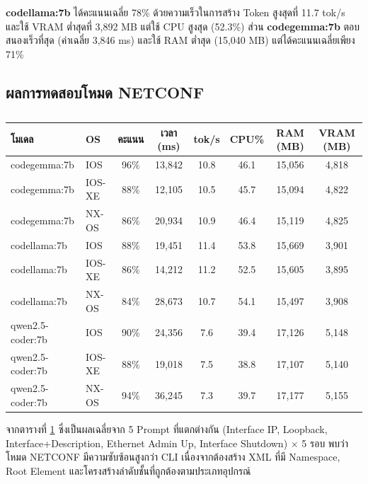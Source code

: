 \hspace*{1.3em}
\textbf{codellama:7b} ได้คะแนนเฉลี่ย 78\% ด้วยความเร็วในการสร้าง Token สูงสุดที่ 11.7 tok/s และใช้ VRAM ต่ำสุดที่ 3,892 MB แต่ใช้ CPU สูงสุด (52.3\%) ส่วน \textbf{codegemma:7b} ตอบสนองเร็วที่สุด (ค่าเฉลี่ย 3,846 ms) และใช้ RAM ต่ำสุด (15,040 MB) แต่ได้คะแนนเฉลี่ยเพียง 71\%

\subsection{ผลการทดสอบโหมด NETCONF}

\begin{table}[H]
    \caption{}
    \label{tab:benchmark-netconf}
    \fontSixTeen
    \centering
    \begin{tabularx}{\textwidth}{|l|l|c|c|c|c|c|c|}
        \hline
        \textbf{โมเดล} & \textbf{OS} & \textbf{คะแนน} & \textbf{เวลา (ms)} & \textbf{tok/s} & \textbf{CPU\%} & \textbf{RAM (MB)} & \textbf{VRAM (MB)} \\
        \hline
        codegemma:7b & IOS & 96\% & 13,842 & 10.8 & 46.1 & 15,056 & 4,818 \\
        \hline
        codegemma:7b & IOS-XE & 88\% & 12,105 & 10.5 & 45.7 & 15,094 & 4,822 \\
        \hline
        codegemma:7b & NX-OS & 86\% & 20,934 & 10.9 & 46.4 & 15,119 & 4,825 \\
        \hline
        codellama:7b & IOS & 88\% & 19,451 & 11.4 & 53.8 & 15,669 & 3,901 \\
        \hline
        codellama:7b & IOS-XE & 86\% & 14,212 & 11.2 & 52.5 & 15,605 & 3,895 \\
        \hline
        codellama:7b & NX-OS & 84\% & 28,673 & 10.7 & 54.1 & 15,497 & 3,908 \\
        \hline
        qwen2.5-coder:7b & IOS & 90\% & 24,356 & 7.6 & 39.4 & 17,126 & 5,148 \\
        \hline
        qwen2.5-coder:7b & IOS-XE & 88\% & 19,018 & 7.5 & 38.8 & 17,107 & 5,140 \\
        \hline
        qwen2.5-coder:7b & NX-OS & 94\% & 36,245 & 7.3 & 39.7 & 17,177 & 5,155 \\
        \hline
    \end{tabularx}
\end{table}

\hspace*{1.3em}
จากตารางที่ \ref{tab:benchmark-netconf} ซึ่งเป็นผลเฉลี่ยจาก 5 Prompt ที่แตกต่างกัน (Interface IP, Loopback, Interface+Description, Ethernet Admin Up, Interface Shutdown) $\times$ 5 รอบ พบว่าโหมด NETCONF มีความซับซ้อนสูงกว่า CLI เนื่องจากต้องสร้าง XML ที่มี Namespace, Root Element และโครงสร้างลำดับชั้นที่ถูกต้องตามประเภทอุปกรณ์

